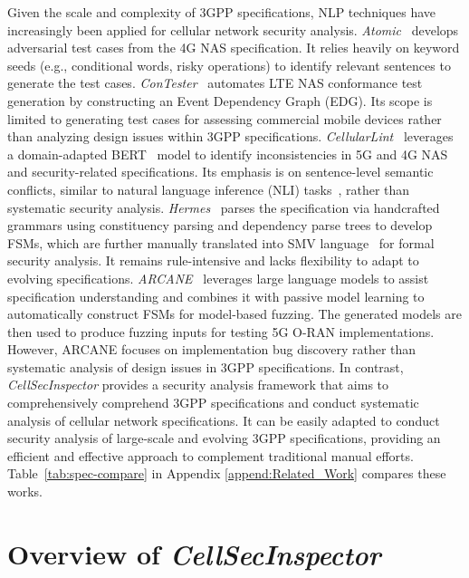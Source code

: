 \documentclass[sigconf]{acmart}
\newcommand{\lm}{\textit{CellSecInspector}\xspace}
\begin{document}
\noindent Given the scale and complexity of 3GPP specifications, NLP techniques have increasingly been applied for cellular network security analysis. 
\textit{Atomic}~\cite{chen2021bookworm} develops adversarial test cases from the 4G NAS specification. It relies heavily on keyword seeds (e.g., conditional words, risky operations) to identify relevant sentences to generate the test cases. 
\textit{ConTester}~\cite{chen2023sherlock} automates LTE NAS conformance test generation by constructing an Event Dependency Graph (EDG). 
Its scope is limited to generating test cases for assessing commercial mobile devices rather than analyzing design issues within 3GPP specifications.  
\textit{CellularLint}~\cite{rahman2024cellularlint} leverages a domain-adapted BERT~\cite{devlin2019bert} model to identify inconsistencies in 5G and 4G NAS and security-related specifications. Its emphasis is on sentence-level semantic conflicts, similar to natural language inference (NLI) tasks~\cite{dagan2005pascal,bowman2015largeannotatedcorpuslearning}, rather than systematic security analysis. 
\textit{Hermes}~\cite{al2024hermes} parses the specification via handcrafted grammars using constituency parsing and dependency parse trees to develop FSMs, which are further manually translated into SMV language~\cite{clarke1996symbolic,al2024hermes,hussain20195greasoner,hussain2018lteinspector} for formal security analysis. 
It remains rule-intensive and lacks flexibility to adapt to evolving specifications. \textit{ARCANE}~\cite{tan2025automated} leverages large language models to assist specification understanding and combines it with passive model learning to automatically construct 
FSMs for model-based fuzzing. The generated models are then used to produce fuzzing inputs for testing 5G O-RAN implementations. However, ARCANE focuses on implementation bug discovery rather than systematic analysis of design issues in 3GPP specifications. In contrast, \lm provides a security analysis framework that aims to comprehensively comprehend 3GPP specifications and conduct systematic analysis of cellular network specifications. It can be easily adapted to conduct security analysis of large-scale and evolving 3GPP specifications, providing an efficient and effective approach to complement traditional manual efforts. Table~\ref{tab:spec-compare} in Appendix \ref{append:Related_Work} compares these works.




\section{Overview of \lm}
\end{document}
